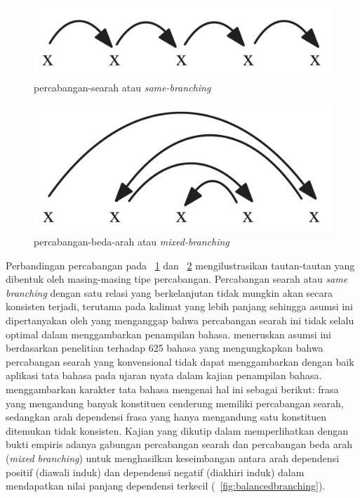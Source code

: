 \documentclass[10pt, a4paper, conference, compsocconf]{IEEEtran}
\begin{document}
\begin{figure}
	\centering \includegraphics[width=0.5
	\textwidth] {pics/samebranching.png} \caption{\Gls{percabangan-searah} atau \textit{same-branching}} 
\label{fig:samebranching} \end{figure}

\begin{figure}
	\centering \includegraphics[width=0.5
	\textwidth] {pics/mixedbranching.png} \caption{\Gls{percabangan-beda-arah} atau \textit{mixed-branching}} 
\label{fig:mixedbranching} \end{figure}

Perbandingan percabangan pada \pic~\ref{fig:samebranching} dan \pic~\ref{fig:mixedbranching} mengilustrasikan tautan-tautan yang dibentuk oleh masing-masing tipe percabangan. Percabangan searah atau \textit{same branching} dengan satu relasi yang berkelanjutan tidak mungkin akan secara konsisten terjadi, terutama pada kalimat yang lebih panjang sehingga asumsi ini dipertanyakan oleh \cite{temperley2008dependency} yang menganggap bahwa percabangan searah ini tidak selalu optimal dalam menggambarkan penampilan bahasa. \cite{temperley2008dependency} meneruskan asumsi ini berdasarkan penelitian \cite{dryer1992greenbergian} terhadap 625 bahasa yang mengungkapkan bahwa percabangan searah yang konvensional tidak dapat menggambarkan dengan baik aplikasi tata bahasa pada ujaran nyata dalam kajian penampilan bahasa. \cite{dryer1992greenbergian} menggambarkan karakter tata bahasa mengenai hal ini sebagai berikut: frasa yang mengandung banyak konstituen cenderung memiliki percabangan searah, sedangkan arah dependensi frasa yang hanya mengandung satu konstituen ditemukan tidak konsisten. Kajian \cite{dryer1992greenbergian} yang dikutip dalam \cite{gildea2010grammars} memperlihatkan dengan bukti empiris adanya gabungan percabangan searah dan percabangan beda arah (\textit{mixed branching}) untuk menghasilkan keseimbangan antara arah dependensi positif (diawali induk) dan dependensi negatif (diakhiri induk) dalam mendapatkan nilai panjang dependensi terkecil (\pic~\ref{fig:balancedbranching}).
\end{document}
